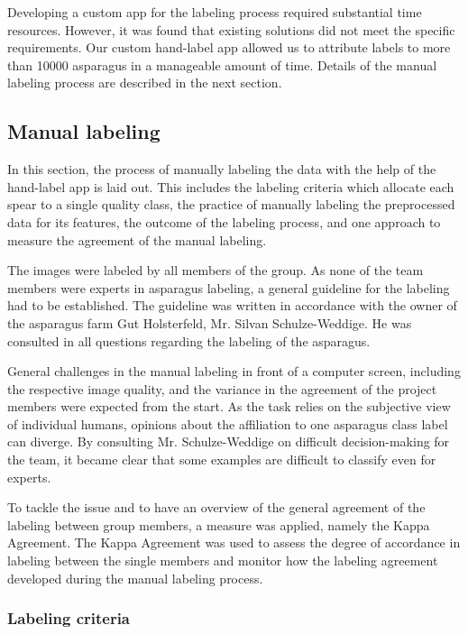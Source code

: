 \bigskip
Developing a custom app for the labeling process required substantial time resources. However, it was found that existing solutions did not meet the specific requirements. Our custom hand-label app allowed us to attribute labels to more than 10000 asparagus in a manageable amount of time. Details of the manual labeling process are described in the next section.


\newpage

\subsection{Manual labeling}
\label{sec:ManualLabeling}

In this section, the process of manually labeling the data with the help of the hand-label app is laid out. This includes the labeling criteria which allocate each spear to a single quality class, the practice of manually labeling the preprocessed data for its features, the outcome of the labeling process, and one approach to measure the agreement of the manual labeling.

\bigskip
The images were labeled by all members of the group. As none of the team members were experts in asparagus labeling, a general guideline for the labeling had to be established. The guideline was written in accordance with the owner of the asparagus farm Gut Holsterfeld, Mr. Silvan Schulze-Weddige. He was consulted in all questions regarding the labeling of the asparagus. 

General challenges in the manual labeling in front of a computer screen, including the respective image quality, and the variance in the agreement of the project members were expected from the start. As the task relies on the subjective view of individual humans, opinions about the affiliation to one asparagus class label can diverge. By consulting Mr. Schulze-Weddige on difficult decision-making for the team, it became clear that some examples are difficult to classify even for experts. 

To tackle the issue and to have an overview of the general agreement of the labeling between group members, a measure was applied, namely the Kappa Agreement. The Kappa Agreement was used to assess the degree of accordance in labeling between the single members and monitor how the labeling agreement developed during the manual labeling process. 


\subsubsection{Labeling criteria}
\label{subsec:SortingCriteria}

